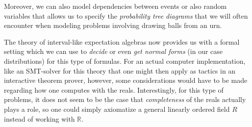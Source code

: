 \documentclass[a4paper]{amsproc}
\theoremstyle{plain}
\theoremstyle{definition}
\theoremstyle{remark}
\numberwithin{equation}{section}
\begin{document}
Moreover, we can also model dependencies between events or also random variables that allows us to specify the \emph{probability tree diagrams} that we will often encounter when modeling problems involving drawing balls from an urn.

The theory of interval-like expectation algebras now provides us with a formal setting which we can use to \emph{decide} or even \emph{get normal forms} (in our case distributions) for this type of formulas. For an actual computer implementation, like an SMT-solver for this theory that one might then apply as tactics in an interactive theorem prover, however, some considerations would have to be made regarding how one computes with the reals. Interestingly, for this type of problems, it does not seem to be the case that \emph{completeness} of the reals actually plays a role, so one could simply axiomatize a general linearly ordered field $R$ instead of working with $\mathbb{R}$.



\end{document}

